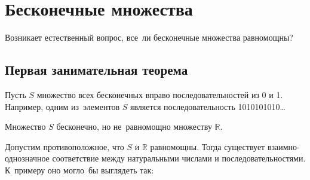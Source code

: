 \documentclass[12pt, a4paper]{article}
\def \N{\ensuremath{\mathbb{R}{ }}}
\begin{document}
 

\section{Бесконечные множества} 

Возникает естественный вопрос, все~ли бесконечные множества равномощны?

\subsection{Первая занимательная теорема}

Пусть $S$ множество всех бесконечных вправо последовательностей из 0 и 1. Например, одним из~элементов $S$ является последовательность 1010101010\ldots

Множество $S$ бесконечно, но не~равномощно множеству $\N$.

Допустим противоположное, что $S$ и $\N$ равномощны. Тогда существует взаимно-однозначное соответствие между натуральными числами и последовательностями. К~примеру оно могло~бы выглядеть так:
\end{document}
